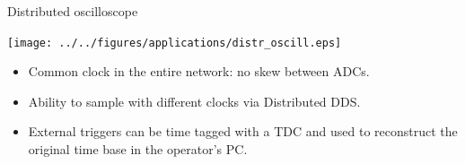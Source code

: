 \documentclass[compress,red]{beamer}
\begin{document}
\begin{frame}{Distributed oscilloscope}
  \begin{center}
    \texttt{[image: ../../figures/applications/distr\_oscill.eps]}
    \end{center}
    \begin{block}{}
      \begin{itemize}
      \item Common clock in the entire network: no skew between ADCs.
      \item Ability to sample with different clocks via Distributed DDS.
      \item External triggers can be time tagged with a TDC and used to reconstruct the original time base in the operator's PC.
      \end{itemize}
    \end{block}
\end{frame}
\end{document}
